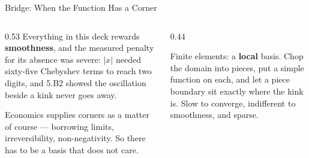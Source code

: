 \begin{frame}{Bridge: When the Function Has a Corner}
\begin{columns}[T]
\begin{column}{0.53\textwidth}
\small
Everything in this deck rewards \textbf{smoothness}, and the measured penalty for its absence was severe: $|x|$ needed sixty-five Chebyshev terms to reach two digits, and 5.B2 showed the oscillation beside a kink never goes away.
\medskip

Economics supplies corners as a matter of course --- borrowing limits, irreversibility, non-negativity. So there has to be a basis that does not care.
\end{column}
\begin{column}{0.44\textwidth}
\begin{conceptbox}[title=\textbf{Next (5.B4)}]\small
Finite elements: a \textbf{local} basis. Chop the domain into pieces, put a simple function on each, and let a piece boundary sit exactly where the kink is. Slow to converge, indifferent to smoothness, and sparse.
\end{conceptbox}
\end{column}
\end{columns}
\end{frame}


